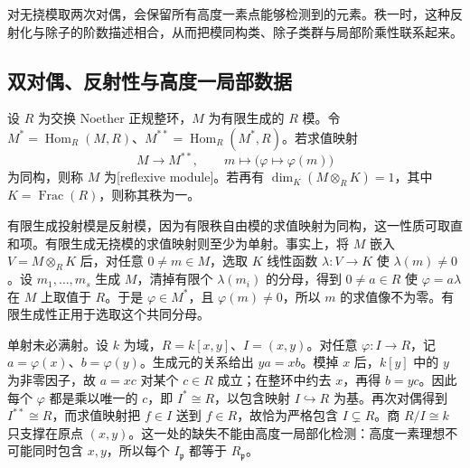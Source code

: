 

对无挠模取两次对偶，会保留所有高度一素点能够检测到的元素。秩一时，这种反射化与除子的阶数描述相合，从而把模同构类、除子类群与局部阶乘性联系起来。


%
%
%

\subsection{双对偶、反射性与高度一局部数据}
\label{b3:subsec:2005:01}

\begin{definition}\label{b3:def:reflexive-module}
	设 \(R\) 为交换 Noether 正规整环，\(M\) 为有限生成的 \(R\) 模。令 \(M^*=\operatorname{Hom}_R(M,R)\)、\(M^{**}=\operatorname{Hom}_R(M^*,R)\)。若求值映射
	\[
		M\longrightarrow M^{**},\qquad m\longmapsto\bigl(\varphi\mapsto\varphi(m)\bigr)
	\]
	为同构，则称 \(M\) 为[reflexive module]。若再有 \(\dim_K(M\otimes_RK)=1\)，其中 \(K=\operatorname{Frac}(R)\)，则称其秩为一。
\end{definition}

有限生成投射模是反射模，因为有限秩自由模的求值映射为同构，这一性质可取直和项。有限生成无挠模的求值映射则至少为单射。事实上，将 \(M\) 嵌入 \(V=M\otimes_RK\) 后，对任意 \(0\ne m\in M\)，选取 \(K\) 线性函数 \(\lambda:V\to K\) 使 \(\lambda(m)\ne0\)。设 \(m_1,\ldots,m_s\) 生成 \(M\)，清掉有限个 \(\lambda(m_i)\) 的分母，得到 \(0\ne a\in R\) 使 \(\varphi=a\lambda\) 在 \(M\) 上取值于 \(R\)。于是 \(\varphi\in M^*\)，且 \(\varphi(m)\ne0\)，所以 \(m\) 的求值像不为零。有限生成性正用于选取这个共同分母。

\ProseParagraphBreak
单射未必满射。设 \(k\) 为域，\(R=k[x,y]\)、\(I=(x,y)\)。对任意 \(\varphi:I\to R\)，记 \(a=\varphi(x)\)、\(b=\varphi(y)\)。生成元的关系给出 \(ya=xb\)。模掉 \(x\) 后，\(k[y]\) 中的 \(y\) 为非零因子，故 \(a=xc\) 对某个 \(c\in R\) 成立；在整环中约去 \(x\)，再得 \(b=yc\)。因此每个 \(\varphi\) 都是乘以唯一的 \(c\)，即 \(I^*\cong R\)，以包含映射 \(I\hookrightarrow R\) 为基。再次对偶得到 \(I^{**}\cong R\)，而求值映射把 \(f\in I\) 送到 \(f\in R\)，故恰为严格包含 \(I\subsetneq R\)。商 \(R/I\cong k\) 只支撑在原点 \((x,y)\)。这一处的缺失不能由高度一局部化检测：高度一素理想不可能同时包含 \(x,y\)，所以每个 \(I_{\mathfrak p}\) 都等于 \(R_{\mathfrak p}\)。

